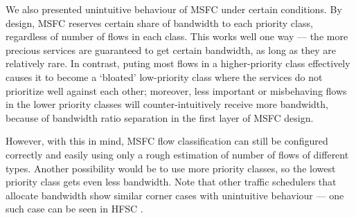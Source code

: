 We also presented unintuitive behaviour of MSFC under certain conditions. By design, MSFC reserves certain share of bandwidth to each priority class, regardless of number of flows in each class. This works well one way --- the more precious services are guaranteed to get certain bandwidth, as long as they are relatively rare. In contrast, puting most flows in a higher-priority class effectively causes it to become a `bloated' low-priority class where the services do not prioritize well against each other; moreover, less important or misbehaving flows in the lower priority classes will counter-intuitively receive more bandwidth, because of bandwidth ratio separation in the first layer of MSFC design.

However, with this in mind, MSFC flow classification can still be configured correctly and easily using only a rough estimation of number of flows of different types. Another possibility would be to use more priority classes, so the lowest priority class gets even less bandwidth. Note that other traffic schedulers that allocate bandwidth show similar corner cases with unintuitive behaviour --- one such case can be seen in HFSC \cite[Corner cases section]{hfscMan}.